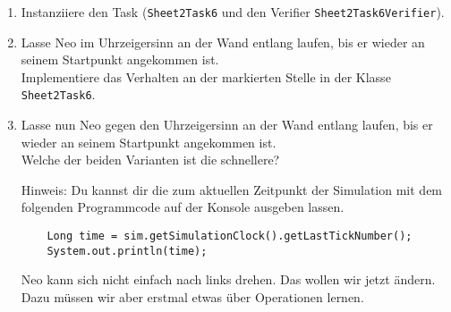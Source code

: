 

\begin{enumerate}
    \item Instanziiere den Task (\lstinline{Sheet2Task6} und den Verifier \lstinline{Sheet2Task6Verifier}).
    \item Lasse Neo im Uhrzeigersinn an der Wand entlang laufen, bis er wieder an seinem Startpunkt angekommen ist.\\
        Implementiere das Verhalten an der markierten Stelle in der Klasse \lstinline{Sheet2Task6}.
    \item Lasse nun Neo gegen den Uhrzeigersinn an der Wand entlang laufen, bis er wieder an seinem Startpunkt angekommen ist.\\
        Welche der beiden Varianten ist die schnellere?

        Hinweis: Du kannst dir die  zum aktuellen Zeitpunkt der Simulation mit dem folgenden Programmcode auf der Konsole ausgeben lassen.

        \begin{lstlisting}
    Long time = sim.getSimulationClock().getLastTickNumber();
    System.out.println(time);
        \end{lstlisting}

        Neo kann sich nicht einfach nach links drehen.
        Das wollen wir jetzt ändern.
        Dazu müssen wir aber erstmal etwas über Operationen lernen.
\end{enumerate}


